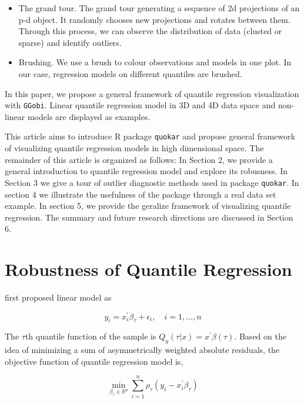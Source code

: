 \documentclass[11pt,a4paper,]{article}
\theoremstyle{definition}
\theoremstyle{definition}
\theoremstyle{remark}
\begin{document}
\begin{itemize}
\item
  The grand tour. The grand tour generating a sequence of 2d projections
  of an p-d object. It randomly chooses new projections and rotates
  between them. Through this process, we can observe the distribution of
  data (clusted or sparse) and identify outliers.
\item
  Brushing. We use a brush to colour observations and models in one
  plot. In our case, regression models on different quantiles are
  brushed.
\end{itemize}

In this paper, we propose a general framework of quantile regression
visualization with \texttt{GGobi}. Linear quantile regression model in
3D and 4D data space and non-linear models are displayed as examples.

This article aims to introduce R package \texttt{quokar} and propose
general framework of visualizing quantile regression models in high
dimensional space. The remainder of this article is organized as
follows: In Section 2, we provide a general introduction to quantile
regression model and explore its robusness. In Section 3 we give a tour
of outlier diagnostic methods used in package \texttt{quokar}. In
section 4 we illustrate the usefulness of the package through a real
data set example. In section 5, we provide the geralize framework of
visualizing quantile regression. The summary and future research
directions are discussed in Section 6.

\section{Robustness of Quantile
Regression}\label{robustness-of-quantile-regression}

\textcite{koenker1978regression} first proposed linear model as

\begin{equation}
y_i=x^{'}_{i}\beta_{\tau}+\epsilon_{i}, \quad i=1,...,n
\label{eq:linear_qr}
\end{equation}

The \(\tau\)th quantile function of the sample is
\(Q_{y}(\tau|x)=x^{'}\beta(\tau)\). Based on the idea of minimizing a
sum of asymmetrically weighted absolute residuals, the objective
function of quantile regression model is,

\begin{equation}
\min_{\beta_{\tau} \in \mathbb{R}^{p}}\sum_{i=1}^{n} \rho_{\tau}(y_i-x_{i}^{'}\beta_{\tau})
\label{eq:object_function}
\end{equation}
\end{document}
